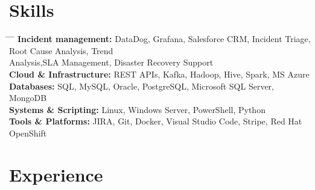 \documentclass[10pt, letterpaper]{article}
\begin{document}
    \section{Skills}
        \begin{tabbing}
    \hspace{4.5cm} \= \hspace{4cm} \= \hspace{4cm} \= \kill %
    \textbf{Incident management:} \> DataDog, Grafana, Salesforce CRM, Incident Triage, Root Cause Analysis, Trend \\ \> Analysis,SLA Management, Disaster Recovery Support \\
    \textbf{Cloud \& Infrastructure:} \> REST APIs, Kafka, Hadoop, Hive, Spark, MS Azure \\
    \textbf{Databases:} \> SQL, MySQL, Oracle, PostgreSQL, Microsoft SQL Server, MongoDB \\
    \textbf{Systems \& Scripting:} \> Linux, Windows Server, PowerShell, Python \\
    \textbf{Tools \& Platforms:} \> JIRA, Git, Docker, Visual Studio Code, Stripe, Red Hat OpenShift
\end{tabbing}

    \section{Experience}
\end{document}
